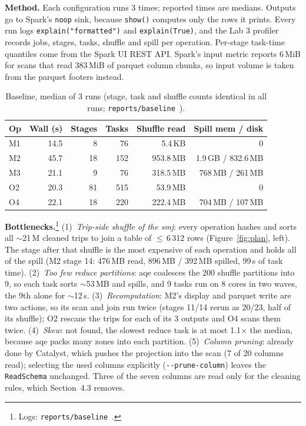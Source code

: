 \documentclass[sigconf]{acmart}
\newcommand{\src}[1]{\footnote{Logs: \texttt{reports/#1}~\cite{repo}.}}
\newcommand{\srcpath}[1]{\texttt{reports/#1}~\cite{repo}}
\begin{document}
\textbf{Method.} Each configuration runs 3 times; reported times are medians.
Outputs go to Spark's \texttt{noop} sink, because \texttt{show()} computes only
the rows it prints. Every run logs \texttt{explain("formatted")} and \texttt{explain(True)},
and the Lab 3 profiler records jobs, stages, tasks, shuffle and spill per
operation. Per-stage task-time quantiles come from the Spark UI REST API\cite{spark-api}.
Spark's input metric reports 6\,MiB for scans that read 383\,MiB of parquet column
chunks, so input volume is taken from the parquet footers instead.

\begin{table}[!t]
      \centering
      \footnotesize
      \setlength{\tabcolsep}{3pt}
      \begin{tabular}{lrrrrr}
            \toprule Op & Wall (s) & Stages & Tasks & Shuffle read & Spill mem / disk    \\
            \midrule M1 & 14.5     & 8      & 76    & 5.4\,KB      & 0                   \\
            M2          & 45.7     & 18     & 152   & 953.8\,MB    & 1.9\,GB / 832.6\,MB \\
            M3          & 21.1     & 9      & 76    & 318.5\,MB    & 768\,MB / 261\,MB   \\
            O2          & 20.3     & 81     & 515   & 53.9\,MB     & 0                   \\
            O4          & 22.1     & 18     & 220   & 222.4\,MB    & 704\,MB / 107\,MB   \\
            \bottomrule
      \end{tabular}
      \caption{Baseline, median of 3 runs (stage, task and shuffle counts identical
            in all runs; \srcpath{baseline}).}
      \label{tab:baseline}
\end{table}

\textbf{Bottlenecks.}\src{baseline} (1)~\emph{Trip-side shuffle of the \gls{smj}}: every
operation hashes and sorts all $\sim$21\,M cleaned trips to join a table of $\le$\,6\,312
rows (Figure~\ref{fig:plan}, left). The stage after that shuffle is the most expensive
of each operation and holds all of the spill (M2 stage 14: 476\,MB read, 896\,MB
/ 392\,MB spilled, 99\,s of task time). (2)~\emph{Too few reduce partitions}: \gls{aqe}
coalesces the 200 shuffle partitions into 9, so each task sorts $\sim$53\,MB
and spills, and 9 tasks run on 8 cores in two waves, the 9th alone for $\sim$12\,s.
(3)~\emph{Recomputation}: M2's display and parquet write are two actions, so its
scan and join run twice (stages 11/14 rerun as 20/23, half of its shuffle); O2
rescans the trips for each of its 3 outputs and O4 scans them twice. (4)~\emph{Skew}:
not found, the slowest reduce task is at most 1.1$\times$ the median, because \gls{aqe}
packs many zones into each partition. (5)~\emph{Column pruning}: already
done by Catalyst, which pushes the projection into the scan (7 of 20 columns
read); selecting the used columns explicitly (\texttt{-{}-prune-column})
leaves the \texttt{ReadSchema} unchanged. Three of the seven columns are read
only for the cleaning rules, which Section~4.3 removes.
\end{document}
